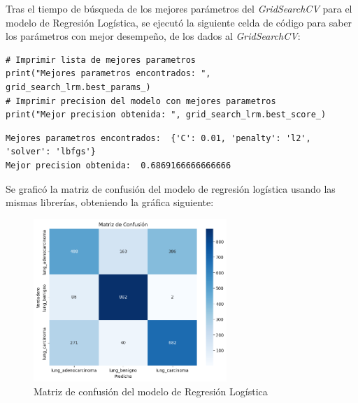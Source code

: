Tras el tiempo de búsqueda de los mejores parámetros del \textit{GridSearchCV} para el modelo de Regresión Logística, se ejecutó la siguiente celda de código para saber los parámetros con mejor desempeño, de los dados al \textit{GridSearchCV}: \\


\begin{lstlisting}[caption={Código para impresión de parámetros con mejor desempeño y evaluación del modelo}]
# Imprimir lista de mejores parametros
print("Mejores parametros encontrados: ", grid_search_lrm.best_params_)
# Imprimir precision del modelo con mejores parametros
print("Mejor precision obtenida: ", grid_search_lrm.best_score_)
\end{lstlisting}


\begin{lstlisting}[caption={Impresión mejores parámetros y evaluación del modelo}]
Mejores parametros encontrados:  {'C': 0.01, 'penalty': 'l2', 'solver': 'lbfgs'}
Mejor precision obtenida:  0.6869166666666666
\end{lstlisting}

Se graficó la matriz de confusión del modelo de regresión logística usando las mismas librerías, obteniendo la gráfica siguiente:

\begin{figure}[H]
    \centering
    \includegraphics[width=0.65\textwidth]{Francisco/Imagenes resultados/CMLR.png} 
    \caption{Matriz de confusión del modelo de Regresión Logística}
\end{figure}

